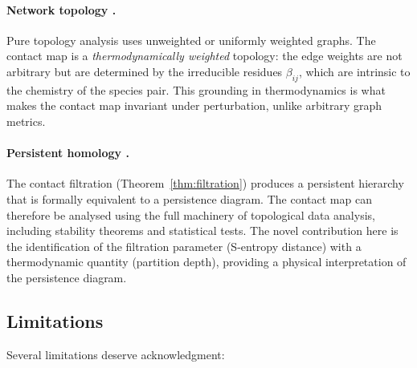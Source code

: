 \documentclass[11pt,twocolumn]{article}
\theoremstyle{plain}
\theoremstyle{definition}
\begin{document}
\paragraph{Network topology \cite{barabasi2004network, jeong2000large,
ravasz2002hierarchical}.}
Pure topology analysis uses unweighted or uniformly weighted graphs. The contact
map is a \emph{thermodynamically weighted} topology: the edge weights are not
arbitrary but are determined by the irreducible residues $\beta_{ij}$, which
are intrinsic to the chemistry of the species pair. This grounding in
thermodynamics is what makes the contact map invariant under perturbation,
unlike arbitrary graph metrics.

\paragraph{Persistent homology \cite{carlsson2009topology,
edelsbrunner2008persistent, rabadan2020topological}.}
The contact filtration (Theorem~\ref{thm:filtration}) produces a persistent
hierarchy that is formally equivalent to a persistence diagram. The contact
map can therefore be analysed using the full machinery of topological data
analysis, including stability theorems and statistical tests. The novel
contribution here is the identification of the filtration parameter (S-entropy
distance) with a thermodynamic quantity (partition depth), providing a physical
interpretation of the persistence diagram.

\subsection{Limitations}

Several limitations deserve acknowledgment:
\end{document}
